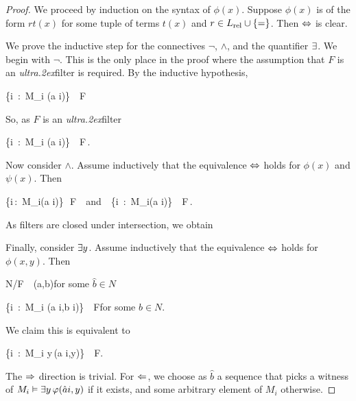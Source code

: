 \documentclass[creche.tex]{subfiles}
\begin{document}
\begin{proof}
We proceed by induction on the syntax of $\phi(x)$. Suppose $\phi(x)$ is of the form $rt(x)$ for some tuple of terms $t(x)$ and $r\in L_{\rm rel}\cup\{=\}$. Then $\Leftrightarrow$ is clear.

We prove the inductive step for the connectives $\neg$, $\wedge$, and the quantifier $\exists$. We begin with $\neg$. This is the only place in the proof where the assumption that $F$ is an \textit{ultra\kern.2ex}filter is required. By the inductive hypothesis,

%
{\IFF}%
{\big\{i\ :\ M_i\; \models\; \phi(\hat a i)\;\big\}\ \notin\ F}

So, as $F$ is an \textit{ultra\kern.2ex}filter

\ceq{}{\IFF}%
{\big\{i\ :\ M_i\; \models\; \neg\phi(\hat a i)\;\big\}\ \in\ F\,.}

Now consider $\wedge$. Assume inductively that the equivalence $\Leftrightarrow$ holds for $\phi(x)$ and $\psi(x)$. Then

%
{\IFF}%
{\big\{i\,:\, M_i\models\phi(\hat a i)\big\}\,\in\, F\ \ {\rm and}\ \ \big\{i\, :\, M_i\models\psi(\hat a i)\big\}\, \in\, F\,.}

As filters are closed under intersection, we obtain


Finally, consider $\exists y$.  Assume inductively that the equivalence $\Leftrightarrow$ holds for $\phi(x,y)$. Then

%
{\IFF}%
{N/F\ \pmodels\  \phi\big(\hat a,\hat b\big)}\hfill for some $\hat b\in N$\phantom{.}

\ceq{}{\IFF}%
{\big\{i\ :\ M_i\; \models\; \phi(\hat a i,\hat b i)\;\big\}\ \in\ F}\hfill for some $\hat b\in N$.

We claim this is equivalent to

\ceq{}{\IFF}%
{\big\{i\ :\ M_i\; \models\; \E y\,\phi(\hat a i,y)\;\big\}\ \in\ F.}

The $\Rightarrow$ direction is trivial. For $\Leftarrow$, we choose as $\hat b$ a sequence that picks a witness of $M_i\vDash\exists y\,\varphi(\hat a i,y)$ if it exists, and some arbitrary element of $M_i$ otherwise.
\end{proof}
\end{document}
